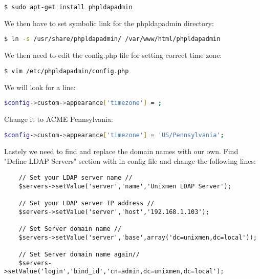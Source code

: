\begin{lstlisting}[language=bash]
  $ sudo apt-get install phpldapadmin
\end{lstlisting}

\vspace{.5em}

\noindent We then have to set symbolic link for the phpldapadmin directory:

\begin{lstlisting}[language=bash]
  $ ln -s /usr/share/phpldapadmin/ /var/www/html/phpldapadmin	
\end{lstlisting}

\vspace{.5em}

\noindent We then need to edit the config.php file for setting correct time 
zone:

\begin{lstlisting}[language=bash]
  $ vim /etc/phpldapadmin/config.php
\end{lstlisting}

\vspace{.5em}

\noindent We will look for a line:
\begin{lstlisting}[language=bash]
  $config->custom->appearance['timezone'] = ;
\end{lstlisting}

\vspace{.5em}

\noindent Change it to ACME Pennsylvania:
\begin{lstlisting}[language=bash]
  $config->custom->appearance['timezone'] = 'US/Pennsylvania';
\end{lstlisting}

\vspace{.5em}

\noindent Lastely we need to find and replace the domain names with our own. 
Find "Define LDAP Servers" section with in config file and 
change the following lines:
\begin{verbatim}
	// Set your LDAP server name //
	$servers->setValue('server','name','Unixmen LDAP Server');
	
	// Set your LDAP server IP address // 
	$servers->setValue('server','host','192.168.1.103');
	
	// Set Server domain name //
	$servers->setValue('server','base',array('dc=unixmen,dc=local'));
	
	// Set Server domain name again//
	$servers->setValue('login','bind_id','cn=admin,dc=unixmen,dc=local');
\end{verbatim}

